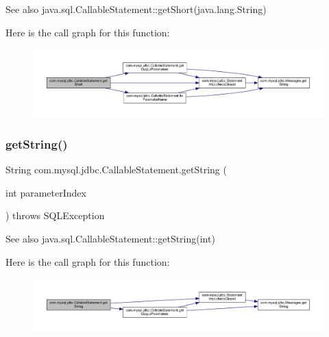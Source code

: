 \begin{DoxySeeAlso}{See also}
java.\+sql.\+Callable\+Statement\+::get\+Short(java.\+lang.\+String) 
\end{DoxySeeAlso}
Here is the call graph for this function\+:\nopagebreak
\begin{figure}[H]
\begin{center}
\leavevmode
\includegraphics[width=350pt]{classcom_1_1mysql_1_1jdbc_1_1_callable_statement_af83744782126809276a8ddb6219abc7f_cgraph}
\end{center}
\end{figure}
\mbox{\label{classcom_1_1mysql_1_1jdbc_1_1_callable_statement_a0ab71db7ed9b1f94b739305284590da0}} 
\subsubsection{\texorpdfstring{get\+String()}{getString()}\hspace{0.1cm}{\footnotesize\ttfamily [1/2]}}
{\footnotesize\ttfamily String com.\+mysql.\+jdbc.\+Callable\+Statement.\+get\+String (\begin{DoxyParamCaption}\item[{int}]{parameter\+Index }\end{DoxyParamCaption}) throws S\+Q\+L\+Exception}

\begin{DoxySeeAlso}{See also}
java.\+sql.\+Callable\+Statement\+::get\+String(int) 
\end{DoxySeeAlso}
Here is the call graph for this function\+:\nopagebreak
\begin{figure}[H]
\begin{center}
\leavevmode
\includegraphics[width=350pt]{classcom_1_1mysql_1_1jdbc_1_1_callable_statement_a0ab71db7ed9b1f94b739305284590da0_cgraph}
\end{center}
\end{figure}
\mbox{\label{classcom_1_1mysql_1_1jdbc_1_1_callable_statement_aed6520b46a5b20440346fb9a487a8bdf}} 
